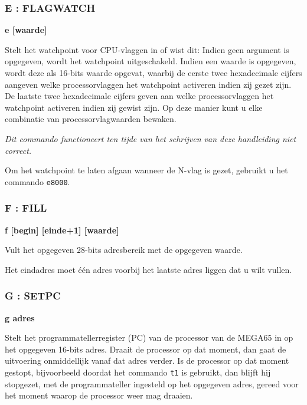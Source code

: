 \subsubsection{E : FLAGWATCH}
\begin{description}[leftmargin=2cm,style=nextline]
\item [Formaat:] {\bf e [waarde]}\item [Gebruik:] Stelt het watchpoint voor CPU-vlaggen in of wist dit: Indien geen argument is opgegeven, wordt het watchpoint uitgeschakeld. Indien een waarde is opgegeven, wordt deze als 16-bits waarde opgevat, waarbij de eerste twee hexadecimale cijfers aangeven welke processorvlaggen het watchpoint activeren indien zij gezet zijn. De laatste twee hexadecimale cijfers geven aan welke processorvlaggen het watchpoint activeren indien zij gewist zijn. Op deze manier kunt u elke combinatie van processorvlagwaarden bewaken.

  {\em Dit commando functioneert ten tijde van het schrijven van deze handleiding niet correct.}

\item [Voorbeeld:]

  Om het watchpoint te laten afgaan wanneer de N-vlag is gezet, gebruikt u het commando {\tt e8000}.

\end{description}

\subsubsection{F : FILL}
\begin{description}[leftmargin=2cm,style=nextline]
\item [Formaat:] {\bf f [begin] [einde+1] [waarde] }\item [Gebruik:] Vult het opgegeven 28-bits adresbereik met de opgegeven waarde.\item [Opmerkingen:] Het eindadres moet één adres voorbij het laatste adres liggen dat u wilt vullen.

\end{description}

\subsubsection{G : SETPC}
\begin{description}[leftmargin=2cm,style=nextline]
\item [Formaat:] {\bf g adres}\item [Gebruik:] Stelt het programmatellerregister (PC) van de processor van de MEGA65 in op het opgegeven 16-bits adres. Draait de processor op dat moment, dan gaat de uitvoering onmiddellijk vanaf dat adres verder. Is de processor op dat moment gestopt, bijvoorbeeld doordat het commando {\tt t1} is gebruikt, dan blijft hij stopgezet, met de programmateller ingesteld op het opgegeven adres, gereed voor het moment waarop de processor weer mag draaien.

\end{description}


